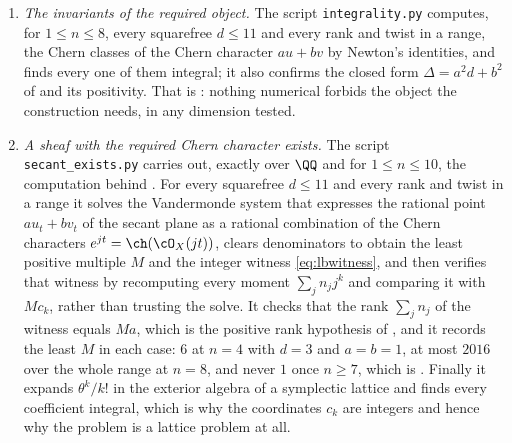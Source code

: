\begin{enumerate}[label=\textup{(\Roman*)},leftmargin=*]
\item \emph{The invariants of the required object.} The script
  \texttt{integrality.py} computes, for $1\le n\le8$, every squarefree
  $d\le11$ and every rank and twist in a range, the Chern classes of the
  Chern character $au+bv$ by Newton's identities, and finds every one of them
  integral; it also confirms the closed form
  $\Delta=a^{2}d+b^{2}$ of  and its positivity.
  That is : nothing numerical forbids the object the
  construction needs, in any dimension tested.

\item \emph{A sheaf with the required Chern character exists.} The script
  \texttt{secant\_\allowbreak exists.py} carries out, exactly over $\QQ$ and for
  $1\le n\le10$, the computation behind . For every
  squarefree $d\le11$ and every rank and twist in a range it solves the
  Vandermonde system that expresses the rational point $au_{t}+bv_{t}$ of the
  secant plane as a rational combination of the Chern characters
  $e^{jt}=\ch(\cO_{X}(jt))$, clears denominators to obtain the least positive
  multiple $M$ and the integer witness \eqref{eq:lbwitness}, and then verifies
  that witness by recomputing every moment $\sum_{j}n_{j}j^{k}$ and comparing
  it with $Mc_{k}$, rather than trusting the solve. It checks that the rank
  $\sum_{j}n_{j}$ of the witness equals $Ma$, which is the positive rank
  hypothesis of , and it records the least $M$ in each case:
  $6$ at $n=4$ with $d=3$ and $a=b=1$, at most $2016$ over the whole range at
  $n=8$, and never $1$ once $n\ge7$, which is . Finally
  it expands $\theta^{k}/k!$ in the exterior algebra of a symplectic lattice
  and finds every coefficient integral, which is why the coordinates $c_{k}$
  are integers and hence why the problem is a lattice problem at all.


\end{enumerate}
